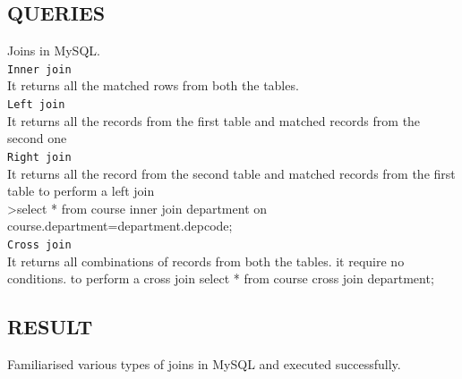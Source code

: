 \documentclass{article}
\begin{document}
\begin{flushleft}
\subsection{QUERIES}
Joins in MySQL.\\
\vspace{0.2in}
\texttt{Inner join}\\
\vspace{0.1in}
It returns all the matched rows from both the tables.\\
\vspace{0.2in}\texttt{Left join}\\
\vspace{0.1in}It returns all the records from the first table and matched records from the second one\\
\vspace{0.2in}\texttt{Right join}\\
\vspace{0.1in}It returns all the record from the second table and matched records from the first table to perform a left join\\
\vspace{0.2in}\textgreater select * from course inner join department on \\ \hspace{0.1in} course.department=department.depcode;\\
\vspace{0.2in}\texttt{Cross join}\\
\vspace{0.1in}It returns all combinations of records from both the tables. it require no conditions.
to perform a cross join
select * from course cross join department;
\subsection{RESULT}
Familiarised various types of joins in MySQL and executed successfully.
\end{flushleft}\newpage
{}
\end{document}
